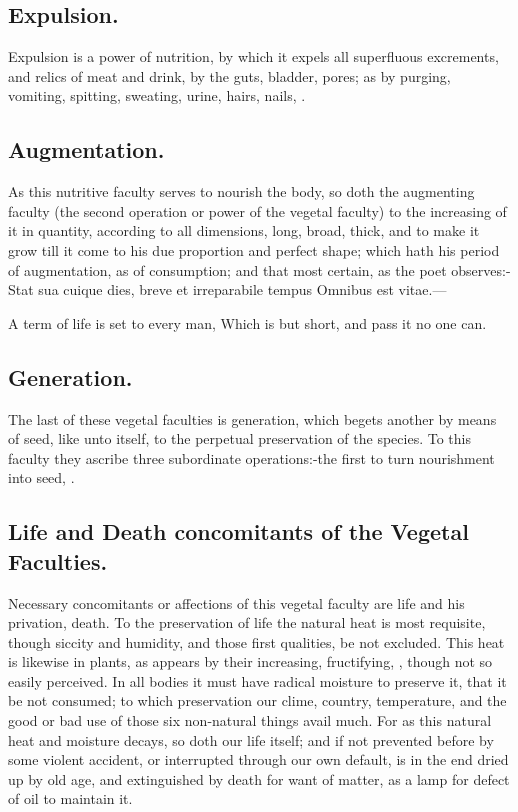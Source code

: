 {\subsection{Expulsion.}
Expulsion is a power of nutrition, by which it expels all
superfluous excrements, and relics of meat and drink, by the guts,
bladder, pores; as by purging, vomiting, spitting, sweating, urine,
hairs, nails, \etc{}.
\subsection{Augmentation.}
As this nutritive faculty serves to nourish the body,
so doth the augmenting faculty (the second operation or power of the
vegetal faculty) to the increasing of it in quantity, according to all
dimensions, long, broad, thick, and to make it grow till it come to his
due proportion and perfect shape; which hath his period of
augmentation, as of consumption; and that most certain, as the poet
observes:-
Stat sua cuique dies, breve et irreparabile tempus
Omnibus est vitae.---

A term of life is set to every man,
Which is but short, and pass it no one can.

\subsection{Generation.}
The last of these vegetal faculties is generation, which
begets another by means of seed, like unto itself, to the perpetual
preservation of the species. To this faculty they ascribe three
subordinate operations:-the first to turn nourishment into seed, \etc{}.
\subsection{Life and Death concomitants of the Vegetal Faculties.}
Necessary
concomitants or affections of this vegetal faculty are life and his
privation, death. To the preservation of life the natural heat is most
requisite, though siccity and humidity, and those first qualities, be
not excluded. This heat is likewise in plants, as appears by their
increasing, fructifying, \etc{}, though not so easily perceived. In all
bodies it must have radical moisture to preserve it, that it be
not consumed; to which preservation our clime, country, temperature,
and the good or bad use of those six non-natural things avail much. For
as this natural heat and moisture decays, so doth our life itself; and
if not prevented before by some violent accident, or interrupted
through our own default, is in the end dried up by old age, and
extinguished by death for want of matter, as a lamp for defect of oil
to maintain it.

}
